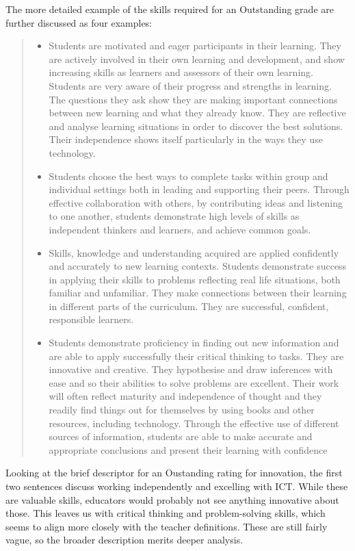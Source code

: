 The more detailed example of the skills required for an Outstanding grade are further discussed as four examples:
\begin{quote}
\begin{itemize}
\item Students are motivated and eager participants in their learning. They are actively involved in their own learning and development, and show increasing skills as learners and assessors of their own learning. Students are very aware of their progress and strengths in learning. The questions they ask show they are making important connections between new learning and what they already know. They are reflective and analyse learning situations in order to discover the best solutions. Their independence shows itself particularly in the ways they use technology.
\item Students choose the best ways to complete tasks within group and individual settings both in leading and supporting their peers. Through effective collaboration with others, by contributing ideas and listening to one another, students demonstrate high levels of skills as independent thinkers and learners, and achieve common goals.
\item Skills, knowledge and understanding acquired are applied confidently and accurately to new learning contexts. Students demonstrate success in applying their skills to problems reflecting real life situations, both familiar and unfamiliar. They make connections between their learning in different parts of the curriculum. They are successful, confident, responsible learners.
\item Students demonstrate proficiency in finding out new information and are able to apply successfully their critical thinking to tasks. They are innovative and creative. They hypothesise and draw inferences with ease and so their abilities to solve problems are excellent. Their work will often reflect maturity and independence of thought and they readily find things out for themselves by using books and other resources, including technology. Through the effective use of different sources of information, students are able to make accurate and appropriate conclusions and present their learning with confidence
\end{itemize}
\end{quote} \cite[p. 34]{ADEC2016}

Looking at the brief descriptor for an Oustanding rating for innovation, the first two sentences discuss working independently and excelling with ICT. While these are valuable skills, educators would probably not see anything innovative about those. This leaves us with critical thinking and problem-solving skills, which seems to align more closely with the teacher definitions. These are still fairly vague, so the broader description merits deeper analysis. 

